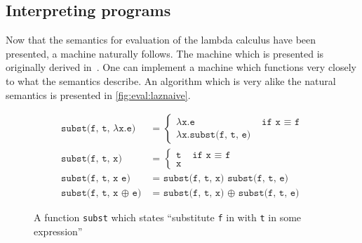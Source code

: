 \subsection{Interpreting programs}
Now that the semantics for evaluation of the lambda calculus have been presented, a machine naturally follows.
The machine which is presented is originally derived in~\cite{sestoft1997deriving}.
One can implement a machine which functions very closely to what the semantics describe.
An algorithm which is very alike the natural semantics is presented in \autoref{fig:eval:laznaive}.
\begin{figure}
\begin{mdframed}
\begin{align}
  \texttt{subst(f, t, $\lambda$x.e) }&\texttt{= } 
  \begin{cases}
    \texttt{$\lambda$x.e }& \texttt{if x $\equiv$ f}\\
    \texttt{$\lambda$x.subst(f, t, e) }&
  \end{cases}\tag*{}\\
  \texttt{subst(f, t, x) }&\texttt{= }
  \begin{cases}
    \texttt{t }& \texttt{if x $\equiv$ f}\\
    \texttt{x }&
  \end{cases}\tag*{}\\
  \texttt{subst(f, t, x e) }&\texttt{= subst(f, t, x) subst(f, t, e)}\tag*{}\\
  \texttt{subst(f, t, x $\oplus$ e) }&\texttt{= subst(f, t, x) $\oplus$ subst(f, t, e)}\tag*{}
\end{align}
\end{mdframed}
  \caption{A function \texttt{subst} which states ``substitute \texttt{f} in with \texttt{t} in some expression''}
  \label{fig:eval:subst}
\end{figure}
